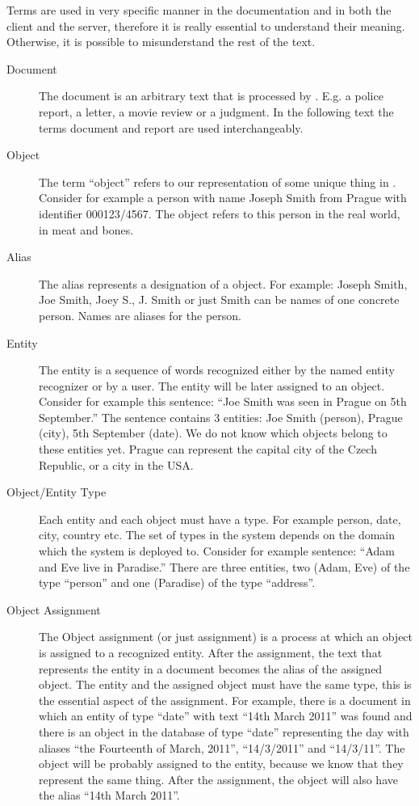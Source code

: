 Terms are used in very specific manner in the documentation and in both the
client and the server, therefore it is really essential to understand their
meaning. Otherwise, it is possible to misunderstand the rest of the text.

\begin{description}
\item[Document]
The document is an arbitrary text that is processed by \textan{}. E.g. a police
report, a letter, a movie review or a judgment. In the following text the terms
document and report are used interchangeably.

\item[Object]
The term ``object'' refers to our representation of some unique thing in
\textan{}. Consider for example a person with name Joseph Smith from Prague with
identifier 000123/4567. The object refers to this person in the real world, in
meat and bones.

\item[Alias]
The alias represents a designation of a object. For example: Joseph Smith, Joe
Smith, Joey S., J. Smith or just Smith can be names of one concrete person.
Names are aliases for the person.

\item[Entity]
The entity is a sequence of words recognized either by the named entity
recognizer or by a user. The entity will be later assigned to an object.
Consider for example this sentence: ``Joe Smith was seen in Prague on 5th
September.'' The sentence contains 3 entities: Joe Smith (person), Prague (city),
5th September (date). We do not know which objects belong to these entities yet.
Prague can represent the capital city of the Czech Republic, or a city in the
USA.

\item[Object/Entity Type]
Each entity and each object must have a type. For example person, date, city, country
etc. The set of types in the system depends on the domain which the system is
deployed to. Consider for example sentence: ``Adam and Eve live in Paradise.'' 
There are three entities, two (Adam, Eve) of the type ``person'' and one (Paradise)
of the type ``address''.

\item[Object Assignment]
The Object assignment (or just assignment) is a process at which an object is
assigned to a recognized entity.  After the assignment, the text that represents
the entity in a document becomes the alias of the assigned object. The entity
and the assigned object must have the same type, this is the essential aspect of
the assignment. For example, there is a document in which an entity of type
``date'' with text ``14th March 2011'' was found and there is an object in the
database of type ``date'' representing the day with aliases ``the Fourteenth of
March, 2011'', ``14/3/2011'' and ``14/3/11''. The object will be probably assigned to
the entity, because we know that they represent the same thing. After the
assignment, the object will also have the alias ``14th March 2011''.


\end{description}
